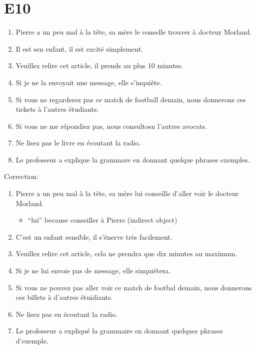\documentclass{book}
\begin{document}
    \section{E10}
        \begin{enumerate}
            \item Pierre a un peu mal à la tête, sa mère le conselle trouver à docteur Morland.
            \item Il est sen enfant, il est excité simplement.
            \item Veuillez relire cet article, il prends au plus 10 minutes.
            \item Si je ne la envoyait une message, elle s'inquiète.
            \item Si vous ne regarderez pas ce match de football demain, nous donnerons ces tickets à l'autres étudiants.
            \item Si vous ne me répondiez pas, nous consultosn l'autres avocats.
            \item Ne lisez pas le livre en écoutant la radio.
            \item Le professeur a explique la grammare en donnant quelque phrases exemples.
        \end{enumerate}
        Correction:
        \begin{enumerate}
            \item Pierre a un peu mal à la tête, sa mère lui conseille d'aller voir le docteur Morland.
            \begin{itemize}
                \item ``lui'' because conseiller à Pierre (indirect object)
            \end{itemize}
            \item C'est un enfant sensible, il s'énerve très facilement.
            \item Veuillez relire cet article, cela ne prendra que dix minutes au maximum.
            \item Si je ne lui envoie pas de message, elle sinquiétera.
            \item Si vous ne pouvez pas aller voir ce match de footbal demain, nous donnerons ces billets à d'autres étuidiants.
            \item Ne lisez pas en écoutant la radio.
            \item Le professeur a expliqué la grammaire en donnant quelques phrases d'exemple.
        \end{enumerate}
\end{document}
